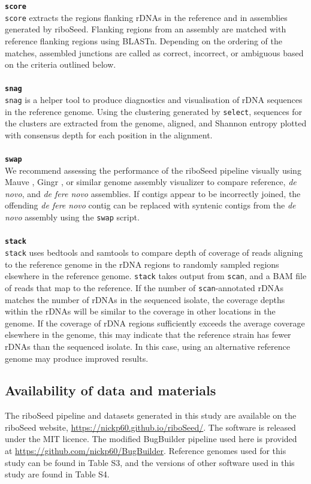 \documentclass[a4,center,fleqn]{NAR}
\begin{document}
\textbf{\texttt{score}}\\
\texttt{score} extracts the regions flanking rDNAs in the reference and in assemblies generated by riboSeed. Flanking regions from an assembly are matched with reference flanking regions using BLASTn. Depending on the ordering of the matches, assembled junctions are called as correct, incorrect, or ambiguous based on the criteria outlined below.\\
\\
\textbf{\texttt{snag}}\\
\texttt{snag} is a helper tool to produce diagnostics and visualisation of rDNA sequences in the reference genome. Using the clustering generated by \texttt{select}, sequences for the clusters are extracted from the genome, aligned, and Shannon entropy \cite{Schmitt1997} plotted with consensus depth for each position in the alignment.\\
\\
\textbf{\texttt{swap}}\\
We recommend assessing the performance of the riboSeed pipeline visually using Mauve \cite{Darling2004,Darling2011}, Gingr \cite{Treangen2014}, or similar genome assembly visualizer to compare reference, \textit{de novo}, and \textit{de fere novo} assemblies. If contigs appear to be incorrectly joined, the offending \textit{de fere novo} contig can be replaced with syntenic contigs from the \textit{de novo} assembly using the \texttt{swap} script.\\
\\
\textbf{\texttt{stack}}\\
\texttt{stack} uses bedtools \cite{Quinlan2010} and samtools \cite{Li2009} to compare depth of coverage of reads aligning to the reference genome in the rDNA regions to randomly sampled regions elsewhere in the reference genome. \texttt{stack} takes output from \texttt{scan}, and a BAM file of reads that map to the reference. If the number of \texttt{scan}-annotated rDNAs matches the number of rDNAs in the sequenced isolate, the coverage depths within the rDNAs will be similar to the coverage in other locations in the genome. If the coverage of rDNA regions sufficiently exceeds the average coverage elsewhere in the genome, this may indicate that the reference strain has fewer rDNAs than the sequenced isolate. In this case, using an alternative reference genome may produce improved results.

\subsection*{Availability of data and materials}
The riboSeed pipeline and datasets generated in this study are available on the riboSeed website, \url{https://nickp60.github.io/riboSeed/}. The software is released under the MIT licence.  The modified BugBuilder pipeline used here is provided at \url{https://github.com/nickp60/BugBuilder}. Reference genomes used for this study can be found in Table S3, and the versions of other software used in this study are found in Table S4.
\end{document}

